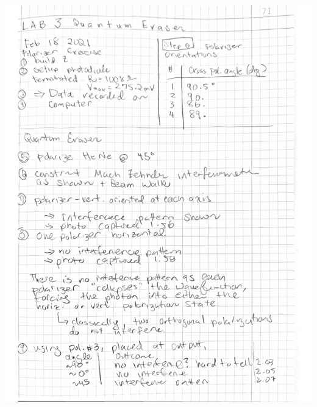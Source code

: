 \documentclass[notitlepage]{report}
\begin{document}
	\begin{center}
		\includegraphics[width=\linewidth]{Scanned_20210302-1405}
	\end{center}
	
\end{document}
